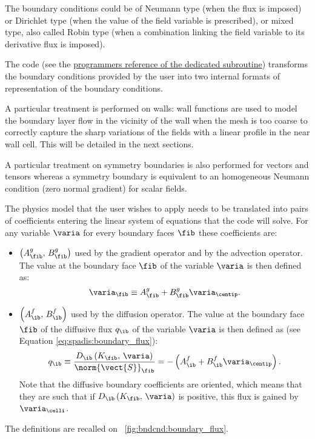 The boundary conditions could be of Neumann type (when the flux is imposed)
or Dirichlet type (when the value of the field variable is prescribed), or mixed type, also
called Robin type (when a combination linking the field variable to its derivative flux
is imposed).

The code (see the \href{../../../doxygen/src/html/condli_8f90.html}{programmers reference of the dedicated subroutine})
 transforms the boundary conditions provided by the user
 into two internal formats of representation of the boundary
 conditions.

 A particular treatment is performed on walls:
 wall functions are used to model the boundary layer flow in the vicinity of the wall when the mesh is too coarse to correctly capture the sharp variations of the fields with a linear profile in the near wall cell.
 This will be detailed in the next sections.

A particular treatment on symmetry boundaries is also performed for vectors and tensors
whereas a symmetry boundary is equivalent to an homogeneous Neumann condition (zero normal gradient) for scalar fields.

The physics model that the user wishes to apply needs to be translated into pairs of coefficients
entering the linear system of equations that the code will solve. For any variable $\varia$ for every boundary faces $\fib$ these coefficients are:

\begin{itemize}
\item $\left( A^g_\fib , \, B^g_\fib\right)$ used by the gradient operator and by the advection operator.
The value at the boundary face $\fib$ of the variable $\varia$ is
then defined as:
\begin{equation}\label{eq:bndcnd:coef_g_def}
\varia_\fib \equiv A^g_\fib + B^g_\fib \varia_\centip.
\end{equation}
%
\item $\left( A^f_\ib , \, B^f_\ib\right)$ used by the diffusion operator.
The value at the boundary face $\fib$ of the diffusive flux $q_\ib$ of the variable $\varia$
is then defined as (see Equation \eqref{eq:spadis:boundary_flux}):
\begin{equation}\label{eq:bndcnd:coef_f_def}
q_\ib \equiv \dfrac{D_\ib \left( K_\fib , \, \varia \right)}{\norm{\vect{S}}_\fib} = -\left(A^f_\ib + B^f_\ib  \varia_\centip\right).
\end{equation}
Note that the diffusive boundary coefficients are oriented, which means that they are such that if $D_\ib \left( K_\fib , \, \varia \right) $ is positive,
this flux is gained by $\varia_\celli$.
\end{itemize}
The definitions are recalled on \figurename~\ref{fig:bndcnd:boundary_flux}.

